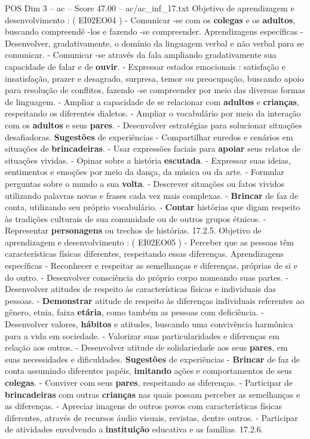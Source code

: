 \begin{textsample}{POS Dim 3 – ac – Score 47.00 – ac/ac\_inf\_17.txt}
Objetivo de aprendizagem e desenvolvimento : ( EI02EO04 ) - Comunicar -se com os \textbf{colegas} e os \textbf{adultos}, buscando compreendê -los e fazendo -se compreender.
Aprendizagens específicas - Desenvolver, gradativamente, o domínio da linguagem verbal e não verbal para se comunicar. - Comunicar -se através da fala ampliando gradativamente sua capacidade de falar e de \textbf{ouvir}. - Expressar estados emocionais : satisfação e insatisfação, prazer e desagrado, surpresa, temor ou preocupação, buscando apoio para resolução de conflitos, fazendo -se compreender por meio das diversas formas de linguagem. - Ampliar a capacidade de se relacionar com \textbf{adultos} e \textbf{crianças}, respeitando os diferentes dialetos. - Ampliar o vocabulário por meio da interação com os \textbf{adultos} e seus \textbf{pares}. - Desenvolver estratégias para solucionar situações desafiadoras. \textbf{Sugestões} de experiências - Compartilhar enredos e cenários em situações de \textbf{brincadeiras}. - Usar expressões faciais para \textbf{apoiar} seus relatos de situações vividas. - Opinar sobre a história \textbf{escutada}. - Expressar suas ideias, sentimentos e emoções por meio da dança, da música ou da arte. - Formular perguntas sobre o mundo a sua \textbf{volta}. - Descrever situações ou fatos vividos utilizando palavras novas e frases cada vez mais complexas. - \textbf{Brincar} de faz de conta, utilizando seu próprio vocabulário. - \textbf{Contar} histórias que digam respeito às tradições culturais de sua comunidade ou de outros grupos étnicos. - Representar \textbf{personagens} ou trechos de histórias. 17.2.5.
Objetivo de aprendizagem e desenvolvimento : ( EI02EO05 ) - Perceber que as pessoas têm características físicas diferentes, respeitando essas diferenças.
Aprendizagens específicas - Reconhecer e respeitar as semelhanças e diferenças, próprias de si e do outro. - Desenvolver consciência do próprio corpo nomeando suas partes. - Desenvolver atitudes de respeito às características físicas e individuais das pessoas. - \textbf{Demonstrar} atitude de respeito às diferenças individuais referentes ao gênero, etnia, faixa \textbf{etária}, como também as pessoas com deficiência. - Desenvolver valores, \textbf{hábitos} e atitudes, buscando uma convivência harmônica para a vida em sociedade. - Valorizar suas particularidades e diferenças em relação aos outros. - Desenvolver atitude de solidariedade aos seus \textbf{pares}, em suas necessidades e dificuldades. \textbf{Sugestões} de experiências - \textbf{Brincar} de faz de conta assumindo diferentes papéis, \textbf{imitando} ações e comportamentos de seus \textbf{colegas}. - Conviver com seus \textbf{pares}, respeitando as diferenças. - Participar de \textbf{brincadeiras} com outras \textbf{crianças} nas quais possam perceber as semelhanças e as diferenças. - Apreciar imagens de outros povos com características físicas diferentes, através de recursos áudio visuais, revistas, dentre outros. - Participar de atividades envolvendo a \textbf{instituição} educativa e as famílias. 17.2.6.

\end{textsample}
